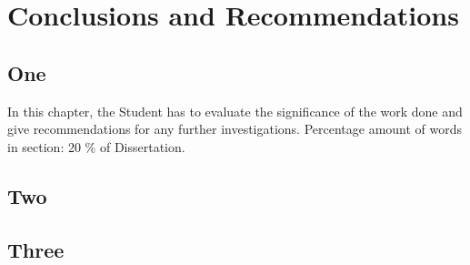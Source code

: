 
\chapter{Conclusions and Recommendations}
\begin{spacing}{2.0}

\section{One}

In this chapter, the Student has to evaluate the significance of the work done and give recommendations for any further investigations. Percentage amount of words in section: 20 \% of Dissertation.

\section{Two}

\section{Three}


\end{spacing}
\newpage
